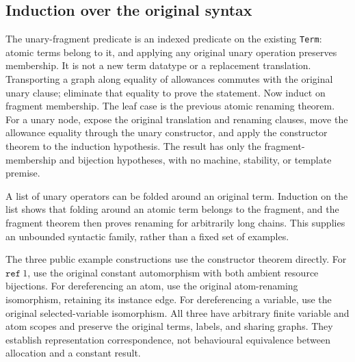
\subsection{Induction over the original syntax}
The unary-fragment predicate is an indexed predicate on the existing
\texttt{Term}: atomic terms belong to it, and applying any original unary
operation preserves membership. It is not a new term datatype or a replacement
translation. Transporting a graph along equality of allowances commutes with
the original unary clause; eliminate that equality to prove the statement.
Now induct on fragment membership. The leaf case is the previous atomic
renaming theorem. For a unary node, expose the original translation and renaming
clauses, move the allowance equality through the unary constructor, and apply
the constructor theorem to the induction hypothesis. The result has only the
fragment-membership and bijection hypotheses, with no machine, stability, or
template premise.


A list of unary operators can be folded around an original term. Induction
on the list shows that folding around an atomic term belongs to the fragment,
and the fragment theorem then proves renaming for arbitrarily long chains.
This supplies an unbounded syntactic family, rather than a fixed set of examples.


The three public example constructions use the constructor theorem directly.
For $\mathtt{ref}\ 1$, use the original constant automorphism with both ambient
resource bijections. For dereferencing an atom, use the original atom-renaming
isomorphism, retaining its instance edge. For dereferencing a variable, use the
original selected-variable isomorphism. All three have arbitrary finite variable
and atom scopes and preserve the original terms, labels, and sharing graphs.
They establish representation correspondence, not behavioural equivalence
between allocation and a constant result.

